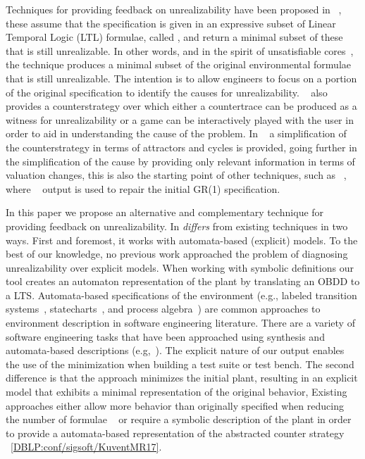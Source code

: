 Techniques for providing feedback on unrealizability have been proposed in ~\cite{DBLP:conf/fmcad/KonighoferHB09, DBLP:journals/scp/Schuppan12,DBLP:conf/fmcad/AlurMT13},
these assume that the specification is given in an expressive subset of Linear Temporal Logic (LTL) formulae, called \gr, and return a minimal subset of these that is still unrealizable. In other words, and in the spirit of unsatisfiable cores~\cite{Torlak:2008}, the technique produces a minimal subset of the original environmental formulae that is still unrealizable. The intention is to allow engineers to focus on a portion of the original specification to identify the causes for unrealizability. ~\cite{DBLP:conf/fmcad/KonighoferHB09} also provides a counterstrategy over which either a countertrace can be produced as a witness for unrealizability or a game can be interactively played with the user in order to aid in understanding the cause of the problem. In ~\cite{DBLP:conf/sigsoft/KuventMR17} a simplification of the counterstrategy in terms of attractors and cycles is provided, going further in the simplification of the cause by providing only relevant information in terms of valuation changes, this is also the starting point of other techniques, such as ~\cite{maoz2019symbolic}, where ~\cite{DBLP:conf/sigsoft/KuventMR17} output is used to repair the initial GR(1) specification.

In this paper we propose an alternative and complementary technique for providing feedback on unrealizability. In \textit{differs} from existing techniques in two ways. First and foremost, it works with automata-based (explicit) models. To the best of our knowledge, no previous work approached the problem of diagnosing unrealizability over explicit models.  When working with symbolic definitions our tool creates an automaton representation of the plant by translating an OBDD to a LTS. Automata-based specifications of the environment (e.g., labeled transition systems~\cite{Keller:1976}, statecharts~\cite{Harel:1987}, and process algebra~\cite{Milner:1982,Hoare:1983}) are common approaches to environment description in software engineering literature. There are a variety of software engineering tasks that have been approached using synthesis and automata-based descriptions (e.g,~\cite{Letier:2013:RMS,DIppolito:2013,Pistore:2004:PMW}). The explicit nature of our output enables the use of the minimization when building a test suite or test bench. The second difference is that the approach minimizes the initial plant, resulting in an explicit model that exhibits a minimal representation of the original behavior,  Existing approaches either allow more behavior than originally specified when reducing the number of formulae ~\cite{DBLP:conf/fmcad/KonighoferHB09} or require a symbolic description of the plant in order to provide a automata-based representation of the abstracted counter strategy ~\ref{DBLP:conf/sigsoft/KuventMR17}. 

